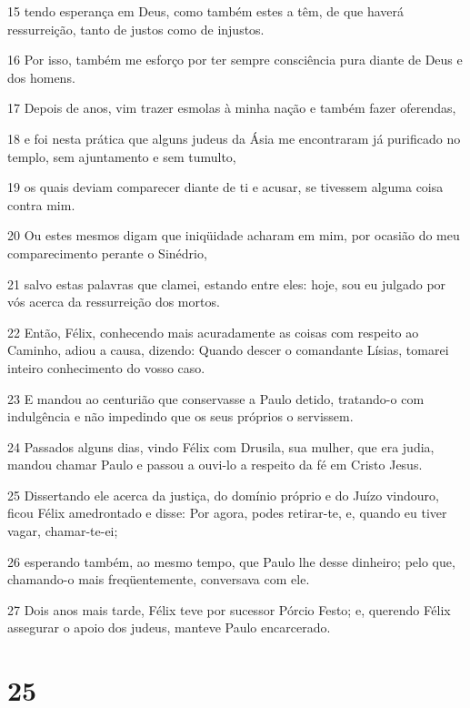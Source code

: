 \par 15 tendo esperança em Deus, como também estes a têm, de que haverá ressurreição, tanto de justos como de injustos.
\par 16 Por isso, também me esforço por ter sempre consciência pura diante de Deus e dos homens.
\par 17 Depois de anos, vim trazer esmolas à minha nação e também fazer oferendas,
\par 18 e foi nesta prática que alguns judeus da Ásia me encontraram já purificado no templo, sem ajuntamento e sem tumulto,
\par 19 os quais deviam comparecer diante de ti e acusar, se tivessem alguma coisa contra mim.
\par 20 Ou estes mesmos digam que iniqüidade acharam em mim, por ocasião do meu comparecimento perante o Sinédrio,
\par 21 salvo estas palavras que clamei, estando entre eles: hoje, sou eu julgado por vós acerca da ressurreição dos mortos.
\par 22 Então, Félix, conhecendo mais acuradamente as coisas com respeito ao Caminho, adiou a causa, dizendo: Quando descer o comandante Lísias, tomarei inteiro conhecimento do vosso caso.
\par 23 E mandou ao centurião que conservasse a Paulo detido, tratando-o com indulgência e não impedindo que os seus próprios o servissem.
\par 24 Passados alguns dias, vindo Félix com Drusila, sua mulher, que era judia, mandou chamar Paulo e passou a ouvi-lo a respeito da fé em Cristo Jesus.
\par 25 Dissertando ele acerca da justiça, do domínio próprio e do Juízo vindouro, ficou Félix amedrontado e disse: Por agora, podes retirar-te, e, quando eu tiver vagar, chamar-te-ei;
\par 26 esperando também, ao mesmo tempo, que Paulo lhe desse dinheiro; pelo que, chamando-o mais freqüentemente, conversava com ele.
\par 27 Dois anos mais tarde, Félix teve por sucessor Pórcio Festo; e, querendo Félix assegurar o apoio dos judeus, manteve Paulo encarcerado.

\chapter{25}


